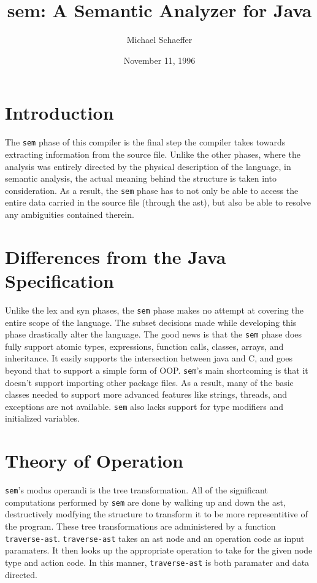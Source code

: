 \documentclass{article}[1994/05/24]
\title{sem: A Semantic Analyzer for Java}
\author{Michael Schaeffer}
\date{November 11, 1996}
\begin{document}
\maketitle


\section{Introduction}

	The \verb|sem| phase of this compiler is the final step the
compiler takes towards extracting information from the source
file. Unlike the other phases, where the analysis was entirely
directed by the physical description of the language, in semantic
analysis, the actual meaning behind the structure is taken into 
consideration. As a result, the \verb|sem| phase has to not only be
able to access the entire data carried in the source file (through
the ast), but also be able to resolve any ambiguities contained
therein.

\section{Differences from the Java Specification}

	Unlike the lex and syn phases, the \verb|sem| phase makes
no attempt at covering the entire scope of the language.  The 
subset decisions made while developing this phase drastically 
alter the language. The good news is that the \verb|sem| phase
does fully support atomic types, expressions, function calls,
classes, arrays, and inheritance. It easily supports the
intersection between java and C, and goes beyond that to
support a simple form of OOP. \verb|sem|'s main shortcoming is that
it  doesn't support importing other package files.  As a result,
many of the basic classes needed to support more advanced
features like strings, threads, and exceptions are not available.
\verb|sem| also lacks support for type modifiers and initialized
variables.

\section{Theory of Operation}

	\verb|sem|'s modus operandi is the tree transformation. All of
the significant computations performed by \verb|sem| are done by
walking up and down the ast, destructively modfying the structure to
transform it to be more representitive of the program.  These tree
transformations are administered by a function \verb|traverse-ast|.
\verb|traverse-ast| takes an ast node and an operation code as input
paramaters.  It then looks up the appropriate operation to take for
the given node type and action code.  In this manner, \verb|traverse-ast| 
is both paramater and data directed.
\end{document}
